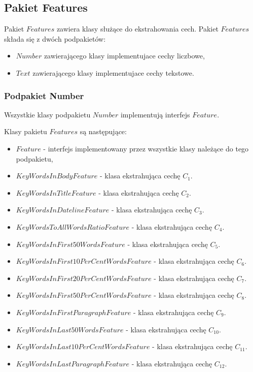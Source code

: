 \documentclass{classrep}
\begin{document}
\subsection{Pakiet Features}
Pakiet $Features$ zawiera klasy służące do ekstrahowania cech. Pakiet $Features$ składa się z dwóch podpakietów:
\begin{itemize}[label=$\bullet$\scshape\bfseries]
\item $Number$ zawierającego klasy implementujace cechy liczbowe,
\item $Text$ zawierającego klasy implementujace cechy tekstowe.
\end{itemize}

\subsubsection{Podpakiet Number}
Wszystkie klasy podpakietu $Number$ implementują interfejs $Feature$. \newline

Klasy pakietu $Features$ są następujące:
\begin{itemize}[label=$\bullet$\scshape\bfseries]
\item $Feature$ - interfejs implementowany przez wszystkie klasy należące do tego podpakietu,
\item $KeyWordsInBodyFeature$ - klasa ekstrahująca cechę $C_{1}$.
\item $KeyWordsInTitleFeature$ - klasa ekstrahująca cechę $C_{2}$.
\item $KeyWordsInDatelineFeature$ - klasa ekstrahująca cechę $C_{3}$.
\item $KeyWordsToAllWordsRatioFeature$ - klasa ekstrahująca cechę $C_{4}$.
\item $KeyWordsInFirst50WordsFeature$ - klasa ekstrahująca cechę $C_{5}$.
\item $KeyWordsInFirst10PerCentWordsFeature$ - klasa ekstrahująca cechę $C_{6}$.
\item $KeyWordsInFirst20PerCentWordsFeature$ - klasa ekstrahująca cechę $C_{7}$.
\item $KeyWordsInFirst50PerCentWordsFeature$ - klasa ekstrahująca cechę $C_{8}$.
\item $KeyWordsInFirstParagraphFeature$ - klasa ekstrahująca cechę $C_{9}$.
\item $KeyWordsInLast50WordsFeature$ - klasa ekstrahująca cechę $C_{10}$.
\item $KeyWordsInLast10PerCentWordsFeature$ - klasa ekstrahująca cechę $C_{11}$.
\item $KeyWordsInLastParagraphFeature$ - klasa ekstrahująca cechę $C_{12}$.\newline
\end{itemize}
\end{document}
